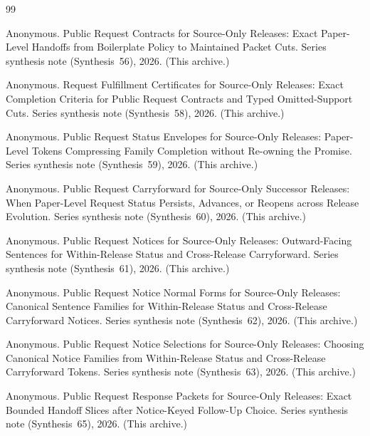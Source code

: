 \documentclass[11pt]{article}
\begin{document}
\begin{thebibliography}{99}\small

Anonymous.
\newblock Public Request Contracts for Source-Only Releases: Exact Paper-Level Handoffs from Boilerplate Policy to Maintained Packet Cuts.
\newblock Series synthesis note (Synthesis~56), 2026. (This archive.)

Anonymous.
\newblock Request Fulfillment Certificates for Source-Only Releases: Exact Completion Criteria for Public Request Contracts and Typed Omitted-Support Cuts.
\newblock Series synthesis note (Synthesis~58), 2026. (This archive.)

Anonymous.
\newblock Public Request Status Envelopes for Source-Only Releases: Paper-Level Tokens Compressing Family Completion without Re-owning the Promise.
\newblock Series synthesis note (Synthesis~59), 2026. (This archive.)

Anonymous.
\newblock Public Request Carryforward for Source-Only Successor Releases: When Paper-Level Request Status Persists, Advances, or Reopens across Release Evolution.
\newblock Series synthesis note (Synthesis~60), 2026. (This archive.)

Anonymous.
\newblock Public Request Notices for Source-Only Releases: Outward-Facing Sentences for Within-Release Status and Cross-Release Carryforward.
\newblock Series synthesis note (Synthesis~61), 2026. (This archive.)

Anonymous.
\newblock Public Request Notice Normal Forms for Source-Only Releases: Canonical Sentence Families for Within-Release Status and Cross-Release Carryforward Notices.
\newblock Series synthesis note (Synthesis~62), 2026. (This archive.)

Anonymous.
\newblock Public Request Notice Selections for Source-Only Releases: Choosing Canonical Notice Families from Within-Release Status and Cross-Release Carryforward Tokens.
\newblock Series synthesis note (Synthesis~63), 2026. (This archive.)

Anonymous.
\newblock Public Request Response Packets for Source-Only Releases: Exact Bounded Handoff Slices after Notice-Keyed Follow-Up Choice.
\newblock Series synthesis note (Synthesis~65), 2026. (This archive.)


\end{thebibliography}
\end{document}
